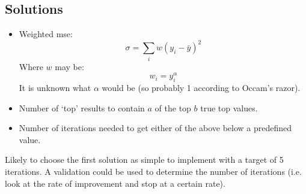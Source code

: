 \documentclass{article}
\begin{document}
\subsection{Solutions}
\begin{itemize}
    \item Weighted mse:
          $$\sigma{}=\sum_i{w(y_i-\bar{y})^2}$$
          Where $w$ may be:
          $$w_i=y_i^\alpha$$
          It is unknown what $\alpha{}$ would be (so probably 1 according to Occam's razor).
    \item Number of `top' results to contain $a$ of the top $b$ true top values.
    \item Number of iterations needed to get either of the above below a predefined value.
\end{itemize}
Likely to choose the first solution as simple to implement with a target of 5 iterations. A validation could be used to determine the number of iterations (i.e. look at the rate of improvement and stop at a certain rate).
\end{document}
